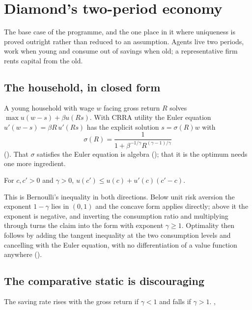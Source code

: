 \section{Diamond's two-period economy}\label{sec:diamond}

The base case of the programme, and the one place in it where uniqueness is proved outright rather
than reduced to an assumption. Agents live two periods, work when young and consume out of savings
when old; a representative firm rents capital from the old.

\subsection{The household, in closed form}

A young household with wage $w$ facing gross return $R$ solves $\max u(w-s)+\beta u(Rs)$. With
CRRA utility the Euler equation $u'(w-s)=\beta R\,u'(Rs)$ has the explicit solution $s=\sigma(R)w$
with
\[
  \sigma(R)=\frac{1}{1+\beta^{-1/\gamma}R^{(\gamma-1)/\gamma}}
\]
(). That $\sigma$ satisfies the Euler equation is algebra
(); that it is the optimum needs one more ingredient.

\begin{proposition}\label{prop:tangent}
For $c,c'>0$ and $\gamma>0$, $u(c')\le u(c)+u'(c)(c'-c)$.
\end{proposition}

This is Bernoulli's inequality in both directions. Below unit risk aversion the exponent $1-\gamma$
lies in $(0,1)$ and the concave form applies directly; above it the exponent is negative, and
inverting the consumption ratio and multiplying through turns the claim into the form with
exponent $\gamma\ge1$. Optimality then follows by adding the tangent inequality at the two
consumption levels and cancelling with the Euler equation, with no differentiation of a value
function anywhere ().

\subsection{The comparative static is discouraging}

\begin{proposition}\label{prop:diamondcs}
The saving rate rises with the gross return if $\gamma<1$ and falls if $\gamma>1$.
, 
\end{proposition}

